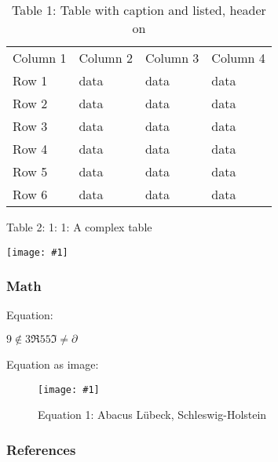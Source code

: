 \documentclass{article}
\newlength{\imgwidth}
\newcommand\scaledgraphics[2]{%
                
\settowidth{\imgwidth}{\texttt{[image: \#1]}}%
                
\setlength{\imgwidth}{\minof{\imgwidth}{#2\textwidth}}%
                
\texttt{[image: \#1]}%
                
}
\begin{document}
\begin{table}
\caption*{Table 1: Table with caption and listed, header on}\label{T66652301}

\begin{tabu} to \textwidth { |X|X|X|X| }
\hline



Column 1 & Column 2 & Column 3 & Column 4
 \\


Row 1 & data & data & data
 \\


Row 2 & data & data & data
 \\


Row 3 & data & data & data
 \\


Row 4 & data & data & data
 \\


Row 5 & data & data & data
 \\


Row 6 & data & data & data
 \\
\hline

\end{tabu}\end{table}


\begin{center}
\begin{table}
\caption*{Table 2:  1:  1: A complex table}\label{F8966261}
\scaledgraphics{9e9b653f-c96b-4f61-94e3-84c0be199871.jpg}{0.5}
\end{table}


\end{center}


\subsubsection{Math}\label{H225619}



Equation:


$9\notin3\mathfrak{\Re }55\mathfrak{\Im }\ne\partial$


Equation as image:

\begin{figure}
\scaledgraphics{c15490e4-8fc0-4e3f-b49c-bbe51655b8d2.jpg}{0.5}
\caption*{Equation 1:  Abacus Lübeck, Schleswig-Holstein}\label{F9394491}
\end{figure}


\subsubsection{References}\label{H7100180}
\end{document}
